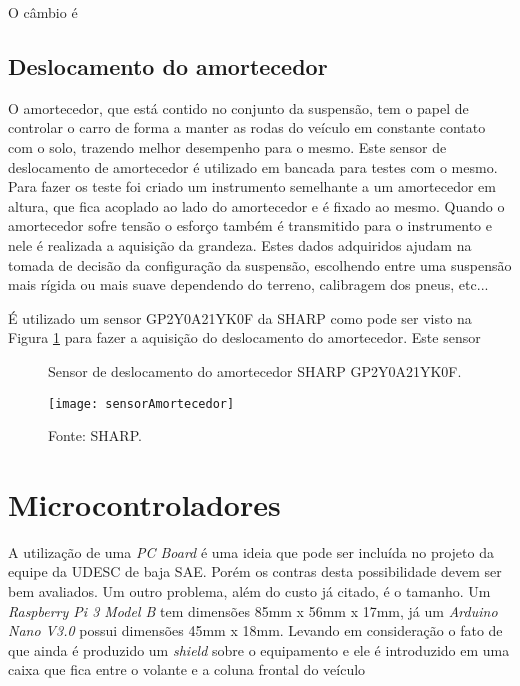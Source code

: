 O câmbio é 

\subsection{Deslocamento do amortecedor}

O amortecedor, que está contido no conjunto da suspensão, tem o papel de controlar o carro de forma a manter as rodas do veículo em constante contato com o solo, trazendo melhor desempenho para o mesmo. Este sensor de deslocamento de amortecedor é utilizado em bancada para testes com o mesmo. Para fazer os teste foi criado um instrumento semelhante a um amortecedor em altura, que fica acoplado ao lado do amortecedor e é fixado ao mesmo. Quando o amortecedor sofre tensão o esforço também é transmitido para o instrumento e nele é realizada a aquisição da grandeza. Estes dados adquiridos ajudam na tomada de decisão da configuração da suspensão, escolhendo entre uma suspensão mais rígida ou mais suave dependendo do terreno, calibragem dos pneus, etc...     

É utilizado um sensor GP2Y0A21YK0F da SHARP como pode ser visto na Figura \ref{fig:sensorAmortecedor} para fazer a aquisição do deslocamento do amortecedor. Este sensor 


\begin{figure}[!htb]
	\centering
		\caption{Sensor de deslocamento do amortecedor SHARP GP2Y0A21YK0F.}
		\texttt{[image: sensorAmortecedor]} 
		\caption*{Fonte: SHARP.}
		\label{fig:sensorAmortecedor}
\end{figure} 


\section{Microcontroladores}
\label{sec:microcontroladores}

A utilização de uma \textit{PC Board} é uma ideia que pode ser incluída no projeto da equipe da UDESC de baja SAE. Porém os contras desta possibilidade devem ser bem avaliados. Um outro problema, além do custo já citado, é o tamanho. Um \textit{Raspberry Pi 3 Model B} tem dimensões 85mm x 56mm x 17mm, já um \textit{Arduino Nano V3.0} possui dimensões 45mm x 18mm. Levando em consideração o fato de que ainda é produzido um \textit{shield} sobre o equipamento e ele é introduzido em uma caixa que fica entre o volante e a coluna frontal do veículo


